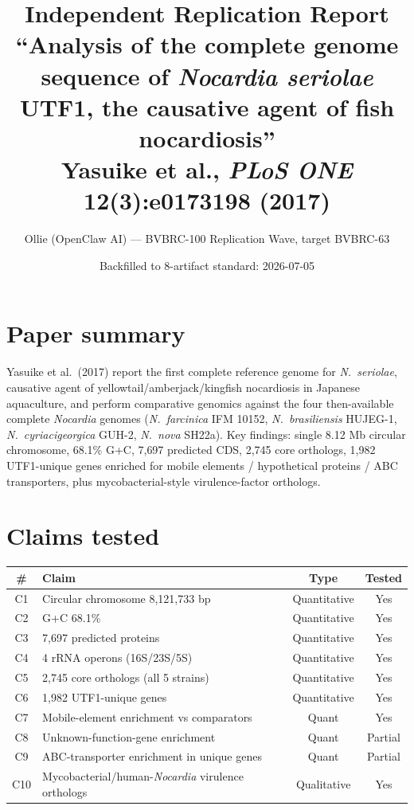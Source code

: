 \documentclass[11pt]{article}
\title{Independent Replication Report\\
\large ``Analysis of the complete genome sequence of \textit{Nocardia seriolae} UTF1,
the causative agent of fish nocardiosis''\\
Yasuike et al., \textit{PLoS ONE} \textbf{12}(3):e0173198 (2017)}
\author{Ollie (OpenClaw AI) --- BVBRC-100 Replication Wave, target BVBRC-63}
\date{Backfilled to 8-artifact standard: 2026-07-05}
\begin{document}
\maketitle

\section{Paper summary}
Yasuike et al.\ (2017) report the first complete reference genome for \textit{N.\ seriolae},
causative agent of yellowtail/amberjack/kingfish nocardiosis in Japanese aquaculture, and
perform comparative genomics against the four then-available complete \textit{Nocardia}
genomes (\textit{N.\ farcinica} IFM 10152, \textit{N.\ brasiliensis} HUJEG-1,
\textit{N.\ cyriacigeorgica} GUH-2, \textit{N.\ nova} SH22a). Key findings: single 8.12 Mb
circular chromosome, 68.1\% G+C, 7{,}697 predicted CDS, 2{,}745 core orthologs, 1{,}982
UTF1-unique genes enriched for mobile elements / hypothetical proteins / ABC transporters,
plus mycobacterial-style virulence-factor orthologs.

\section{Claims tested}
\begin{longtable}{clcc}
\toprule
\# & Claim & Type & Tested \\
\midrule
C1 & Circular chromosome 8{,}121{,}733 bp & Quantitative & Yes \\
C2 & G+C 68.1\% & Quantitative & Yes \\
C3 & 7{,}697 predicted proteins & Quantitative & Yes \\
C4 & 4 rRNA operons (16S/23S/5S) & Quantitative & Yes \\
C5 & 2{,}745 core orthologs (all 5 strains) & Quantitative & Yes \\
C6 & 1{,}982 UTF1-unique genes & Quantitative & Yes \\
C7 & Mobile-element enrichment vs comparators & Quant & Yes \\
C8 & Unknown-function-gene enrichment & Quant & Partial \\
C9 & ABC-transporter enrichment in unique genes & Quant & Partial \\
C10 & Mycobacterial/human-\textit{Nocardia} virulence orthologs & Qualitative & Yes \\
\bottomrule
\end{longtable}
\end{document}
